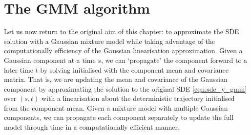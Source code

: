 \section{The GMM algorithm}\label{sec:gmm_alg}
Let us now return to the original aim of this chapter: to approximate the SDE solution with a Gaussian mixture model while taking advantage of the computationally efficiency of the Gaussian linearisation approximation.
Given a Gaussian component at a time \(s\), we can `propagate' the component forward to a later time \(t\) by solving  initialised with the component mean and covariance matrix.
That is, we are updating the mean and covariance of the Gaussian component by approximating the solution to the original SDE \cref{eqn:sde_y_gmm} over \((s,t)\) with a linearisation about the deterministic trajectory initialised from the component mean.
Given a mixture model with multiple Gaussian components, we can propagate each component separately to update the full model through time in a computationally efficient manner.

